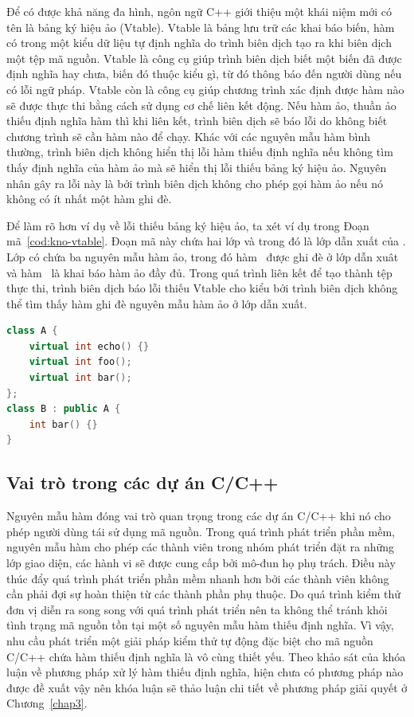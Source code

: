Để có được khả năng đa hình, ngôn ngữ C++ giới thiệu một khái niệm mới có tên là bảng ký hiệu ảo (Vtable). Vtable là bảng lưu trữ các khai báo biến, hàm có trong một kiểu dữ liệu tự định nghĩa do trình biên dịch tạo ra khi biên dịch một tệp mã nguồn. Vtable là công cụ giúp trình biên dịch biết một biến đã được định nghĩa hay chưa, biến đó thuộc kiểu gì, từ đó thông báo đến người dùng nếu có lỗi ngữ pháp. Vtable còn là công cụ giúp chương trình xác định được hàm nào sẽ được thực thi bằng cách sử dụng cơ chế liên kết động. Nếu hàm ảo, thuần ảo thiếu định nghĩa hàm thì khi liên kết, trình biên dịch sẽ báo lỗi do không biết chương trình sẽ cần hàm nào để chạy. Khác với các nguyên mẫu hàm bình thường, trình biên dịch không hiển thị lỗi hàm thiếu định nghĩa nếu không tìm thấy định nghĩa của hàm ảo mà sẽ hiển thị lỗi thiếu bảng ký hiệu ảo. Nguyên nhân gây ra lỗi này là bởi trình biên dịch không cho phép gọi hàm ảo nếu nó không có ít nhất một hàm ghi đè.

Để làm rõ hơn ví dụ về lỗi thiếu bảng ký hiệu ảo, ta xét ví dụ trong Đoạn mã~\ref{cod:kno-vtable}. Đoạn mã này chứa hai lớp  và  trong đó  là lớp dẫn xuất của . Lớp  có chứa ba nguyên mẫu hàm ảo, trong đó hàm~ được ghi đè ở lớp dẫn xuât và hàm~ là khai báo hàm ảo đầy đủ. Trong quá trình liên kết để tạo thành tệp thực thi, trình biên dịch báo lỗi thiếu Vtable cho kiểu  bởi trình biên dịch không thể tìm thấy hàm ghi đè nguyên mẫu hàm ảo  ở lớp dẫn xuất.

\vspace{5mm}
\begin{lstlisting}[language=C++, captionpos=b, caption={Ví dụ về lỗi thiếu bảng ký hiệu ảo.}, label={cod:kno-vtable}]
class A {
	virtual int echo() {}
	virtual int foo();
	virtual int bar();
};
class B : public A {
	int bar() {}
}
\end{lstlisting}
\subsection{Vai trò trong các dự án C/C++}
Nguyên mẫu hàm đóng vai trò quan trọng trong các dự án C/C++ khi nó cho phép người dùng tái sử dụng mã nguồn. Trong quá trình phát triển phần mềm, nguyên mẫu hàm cho phép các thành viên trong nhóm phát triển đặt ra những lớp giao diện, các hành vi sẽ được cung cấp bởi mô-đun họ phụ trách. Điều này thúc đẩy quá trình phát triển phần mềm nhanh hơn bởi các thành viên không cần phải đợi sự hoàn thiện từ các thành phần phụ thuộc. Do quá trình kiểm thử đơn vị diễn ra song song với quá trình phát triển nên ta không thể tránh khỏi tình trạng mã nguồn tồn tại một số nguyên mẫu hàm thiếu định nghĩa. Vì vậy, nhu cầu phát triển một giải pháp kiểm thử tự động đặc biệt cho mã nguồn C/C++ chứa hàm thiếu định nghĩa là vô cùng thiết yếu. Theo khảo sát của khóa luận về phương pháp xử lý hàm thiếu định nghĩa, hiện chưa có phương pháp nào được đề xuất vậy nên khóa luận sẽ thảo luận chi tiết về phương pháp giải quyết ở Chương~\ref{chap3}.

